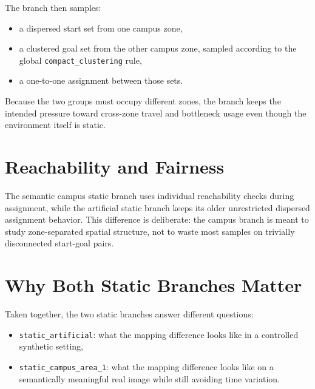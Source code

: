 \documentclass[11pt]{article}
\begin{document}
The branch then samples:
\begin{itemize}[leftmargin=2em]
    \item a dispersed start set from one campus zone,
    \item a clustered goal set from the other campus zone, sampled according to the global \texttt{compact\_clustering} rule,
    \item a one-to-one assignment between those sets.
\end{itemize}

Because the two groups must occupy different zones, the branch keeps the intended pressure toward cross-zone travel and bottleneck usage even though the environment itself is static.

\section{Reachability and Fairness}

The semantic campus static branch uses individual reachability checks during assignment, while the artificial static branch keeps its older unrestricted dispersed assignment behavior. This difference is deliberate: the campus branch is meant to study zone-separated spatial structure, not to waste most samples on trivially disconnected start-goal pairs.

\section{Why Both Static Branches Matter}

Taken together, the two static branches answer different questions:
\begin{itemize}[leftmargin=2em]
    \item \texttt{static\_artificial}: what the mapping difference looks like in a controlled synthetic setting,
    \item \texttt{static\_campus\_area\_1}: what the mapping difference looks like on a semantically meaningful real image while still avoiding time variation.
\end{itemize}
\end{document}
